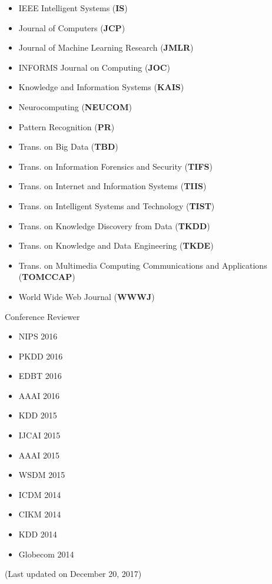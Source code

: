 \documentclass[margin, 9pt]{res}
\begin{document}
\begin{resume}
\begin{itemize}
\item IEEE Intelligent Systems (\textbf{IS})
\item Journal of Computers (\textbf{JCP})
\item Journal of Machine Learning Research (\textbf{JMLR})
\item INFORMS Journal on Computing (\textbf{JOC})
\item Knowledge and Information Systems (\textbf{KAIS})
\item Neurocomputing (\textbf{NEUCOM})
\item Pattern Recognition (\textbf{PR})
\item Trans. on Big Data (\textbf{TBD})
\item Trans. on Information Forensics and Security (\textbf{TIFS})
\item Trans. on Internet and Information Systems (\textbf{TIIS})
\item Trans. on Intelligent Systems and Technology (\textbf{TIST})
\item Trans. on Knowledge Discovery from Data (\textbf{TKDD})
\item Trans. on Knowledge and Data Engineering (\textbf{TKDE})
\item Trans. on Multimedia Computing Communications and Applications (\textbf{TOMCCAP})
\item World Wide Web Journal (\textbf{WWWJ})
\end{itemize}
\vspace{-0.1in}
{Conference Reviewer}
\vspace{-0.15in}
\begin{multicols}{3}
\begin{itemize}
\item NIPS 2016
\item PKDD 2016
\item EDBT 2016
\item AAAI 2016
\item KDD 2015
\item IJCAI 2015
\item AAAI 2015
\item WSDM 2015
\item ICDM 2014
\item CIKM 2014
\item KDD 2014
\item Globecom 2014
\end{itemize}
\end{multicols}

(Last updated on December 20, 2017)
\end{resume}
\end{document}

